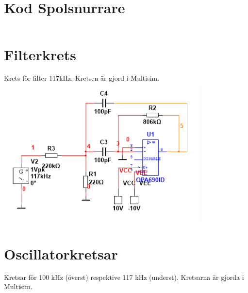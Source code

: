 \documentclass[a4paper]{article}
\begin{document}
\begin{sloppypar}
    \section{Kod Spolsnurrare}
    \label{bilaga:Kod_Spolsnurrare}
    \inputminted[breaklines]{cpp}{./Code/Spolsnurrare.cpp}

    \newpage
    \section{Filterkrets}
    \label{bilaga:Kretsschema-filter}
    Krets för filter 117kHz. Kretsen är gjord i Multisim.
    \includegraphics[width = 0.8\textwidth]{filter117kHz-circuit.png}

    \newpage
    \section{Oscillatorkretsar}
    Kretsar för 100 kHz (överst) respektive 117 kHz (underst). Kretsarna är gjorda i Multisim.


\end{sloppypar}
\end{document}
